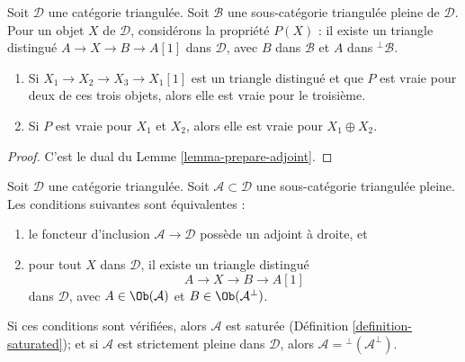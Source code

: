 \begin{lemma}
\label{lemma-prepare-adjoint-dual}
Soit $\mathcal{D}$ une catégorie triangulée. Soit $\mathcal{B}$ une
sous-catégorie triangulée pleine de $\mathcal{D}$. Pour un objet $X$ de
$\mathcal{D}$, considérons la propriété $P(X)$ : il existe un triangle
distingué $A \to X \to B \to A[1]$ dans $\mathcal{D}$, avec $B$ dans
$\mathcal{B}$ et $A$ dans ${}^\perp\mathcal{B}$.
\begin{enumerate}
\item Si $X_1 \to X_2 \to X_3 \to X_1[1]$ est un triangle distingué et que
$P$ est vraie pour deux de ces trois objets, alors elle est vraie pour le
troisième.
\item Si $P$ est vraie pour $X_1$ et $X_2$, alors elle est vraie pour
$X_1 \oplus X_2$.
\end{enumerate}
\end{lemma}

\begin{proof}
C'est le dual du Lemme \ref{lemma-prepare-adjoint}.
\end{proof}

\begin{lemma}
\label{lemma-right-adjoint}
Soit $\mathcal{D}$ une catégorie triangulée. Soit
$\mathcal{A} \subset \mathcal{D}$ une sous-catégorie triangulée pleine.
Les conditions suivantes sont équivalentes :
\begin{enumerate}
\item le foncteur d'inclusion $\mathcal{A} \to \mathcal{D}$ possède un
adjoint à droite, et
\item pour tout $X$ dans $\mathcal{D}$, il existe un triangle distingué
$$
A \to X \to B \to A[1]
$$
dans $\mathcal{D}$, avec $A \in \Ob(\mathcal{A})$ et
$B \in \Ob(\mathcal{A}^\perp)$.
\end{enumerate}
Si ces conditions sont vérifiées, alors $\mathcal{A}$ est saturée
(Définition \ref{definition-saturated}); et si $\mathcal{A}$ est strictement
pleine dans $\mathcal{D}$, alors
$\mathcal{A} = {}^\perp(\mathcal{A}^\perp)$.
\end{lemma}

